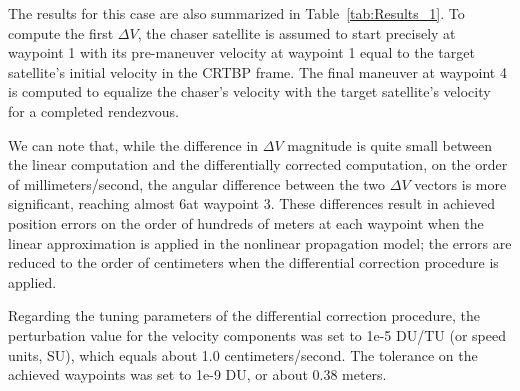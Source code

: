 \documentclass[letterpaper, preprint, paper,11pt]{AAS}	%
\begin{document}
The results for this case are also summarized in Table~\ref{tab:Results_1}.  To compute the first \(\Delta V\), the chaser satellite is assumed to start precisely at waypoint 1 with its pre-maneuver velocity at waypoint 1 equal to the target satellite's initial velocity in the CRTBP frame.  The final maneuver at waypoint 4 is computed to equalize the chaser's velocity with the target satellite's velocity for a completed rendezvous.

We can note that, while the difference in \(\Delta V\) magnitude is quite small between the linear computation and the differentially corrected computation, on the order of millimeters/second, the angular difference between the two \(\Delta V\) vectors is more significant, reaching almost 6\textdegree at waypoint 3.  These differences result in achieved position errors on the order of hundreds of meters at each waypoint when the linear approximation is applied in the nonlinear propagation model; the errors are reduced to the order of centimeters when the differential correction procedure is applied.

Regarding the tuning parameters of the differential correction procedure, the perturbation value for the velocity components was set to 1e-5 DU/TU (or speed units, SU), which equals about 1.0 centimeters/second.  The tolerance on the achieved waypoints was set to 1e-9 DU, or about 0.38 meters.  




\end{document}
